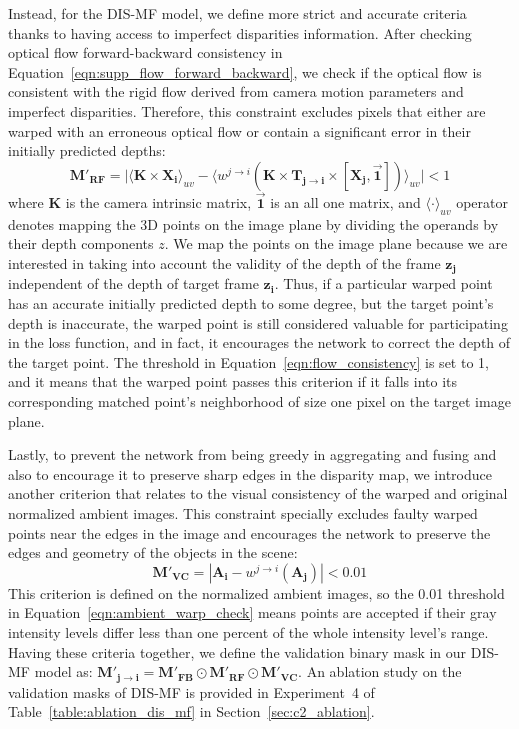 Instead, for the DIS-MF model, we define more strict and accurate criteria thanks to having access to imperfect disparities information. After checking optical flow forward-backward consistency in Equation~\eqref{eqn:supp_flow_forward_backward}, we check if the optical flow is consistent with the rigid flow derived from camera motion parameters and imperfect disparities. Therefore, this constraint excludes pixels that either are warped with an erroneous optical flow or contain a significant error in their initially predicted depths:
\begin{equation}\label{eqn:flow_consistency}
    \boldsymbol{M'_{RF}} = \Big|\langle \boldsymbol{K} \times \boldsymbol{X_{i}}\rangle_{uv} - \big\langle w^{j \rightarrow i}
    (\boldsymbol{K} \times \boldsymbol{T_{j \rightarrow i}} \times [\boldsymbol{X_{j}},\vec{\mathbf{1}}])\big\rangle_{uv}   \Big| < 1
\end{equation}
where $\boldsymbol{K}$ is the camera intrinsic matrix, $\vec{\mathbf{1}}$ is an all one matrix, and $\langle\cdot\rangle_{uv}$ operator denotes mapping the 3D points on the image plane by dividing the operands by their depth components $z$. We map the points on the image plane because we are interested in taking into account the validity of the depth of the frame $\boldsymbol{z_j}$ independent of the depth of target frame $\boldsymbol{z_i}$. Thus, if a particular warped point has an accurate initially predicted depth to some degree, but the target point's depth is inaccurate, the warped point is still considered valuable for participating in the loss function, and in fact, it encourages the network to correct the depth of the target point. The threshold in Equation~\eqref{eqn:flow_consistency} is set to 1, and it means that the warped point passes this criterion if it falls into its corresponding matched point's neighborhood of size one pixel on the target image plane.

Lastly, to prevent the network from being greedy in aggregating and fusing and also to encourage it to preserve sharp edges in the disparity map, we introduce another criterion that relates to the visual consistency of the warped and original normalized ambient images. This constraint specially excludes faulty warped points near the edges in the image and encourages the network to preserve the edges and geometry of the objects in the scene:
\begin{equation}\label{eqn:ambient_warp_check}
    \boldsymbol{M'_{VC}} = |\boldsymbol{A_{i}} - w^{j \rightarrow i}(\boldsymbol{A_{j}})|< 0.01
\end{equation}
This criterion is defined on the normalized ambient images, so the 0.01 threshold in Equation~\eqref{eqn:ambient_warp_check} means points are accepted if their gray intensity levels differ less than one percent of the whole intensity level's range. Having these criteria together, we define the validation binary mask in our DIS-MF model as: $\boldsymbol{M'_{j \rightarrow i}} = \boldsymbol{M'_{FB}} \odot \boldsymbol{M'_{RF}} \odot \boldsymbol{M'_{VC}}$. An ablation study on the validation masks of DIS-MF is provided in Experiment~4 of Table~\ref{table:ablation_dis_mf} in Section~\ref{sec:c2_ablation}.

